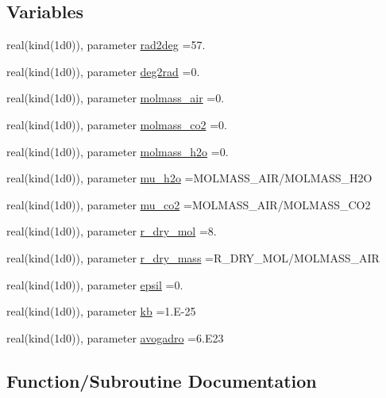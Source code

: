 \subsection*{Variables}
\begin{DoxyCompactItemize}
\item 
real(kind(1d0)), parameter \hyperlink{namespacemeteo_ae4e33b320117dc89986bd1d37a18ae74}{rad2deg} =57.
\item 
real(kind(1d0)), parameter \hyperlink{namespacemeteo_a6acb74c9a7ddfe85ba69112897754791}{deg2rad} =0.
\item 
real(kind(1d0)), parameter \hyperlink{namespacemeteo_a54b7cd84df1d97cb79965d43460ad694}{molmass\+\_\+air} =0.
\item 
real(kind(1d0)), parameter \hyperlink{namespacemeteo_acb7ea078c76c3b3d8eed2c1f1df3f6ba}{molmass\+\_\+co2} =0.
\item 
real(kind(1d0)), parameter \hyperlink{namespacemeteo_aae3f90f9d5c4581ccb0a05acee54f2ac}{molmass\+\_\+h2o} =0.
\item 
real(kind(1d0)), parameter \hyperlink{namespacemeteo_ac6780e7f2432c338fc92d3ef2eca5089}{mu\+\_\+h2o} =M\+O\+L\+M\+A\+S\+S\+\_\+\+A\+IR/M\+O\+L\+M\+A\+S\+S\+\_\+\+H2O
\item 
real(kind(1d0)), parameter \hyperlink{namespacemeteo_a5e25bc167da1551976c0f934a28b9c41}{mu\+\_\+co2} =M\+O\+L\+M\+A\+S\+S\+\_\+\+A\+IR/M\+O\+L\+M\+A\+S\+S\+\_\+\+C\+O2
\item 
real(kind(1d0)), parameter \hyperlink{namespacemeteo_a6b0124b140e3a372291310b9c292ceda}{r\+\_\+dry\+\_\+mol} =8.
\item 
real(kind(1d0)), parameter \hyperlink{namespacemeteo_aeb38e2ee75a5100806164ecfd458a956}{r\+\_\+dry\+\_\+mass} =R\+\_\+\+D\+R\+Y\+\_\+\+M\+OL/M\+O\+L\+M\+A\+S\+S\+\_\+\+A\+IR
\item 
real(kind(1d0)), parameter \hyperlink{namespacemeteo_a63de0dfce55a22ba48600ea13d0e216d}{epsil} =0.
\item 
real(kind(1d0)), parameter \hyperlink{namespacemeteo_a4ac27cf4384cebc39c7c0ec998ec5579}{kb} =1.\+E-\/25
\item 
real(kind(1d0)), parameter \hyperlink{namespacemeteo_aaf725e1853e17e82e0db242dcf619c15}{avogadro} =6.\+E23
\end{DoxyCompactItemize}


\subsection{Function/\+Subroutine Documentation}
\mbox{\label{namespacemeteo_a2d3b6838da7330c4e146845991c0bc8a}} 
